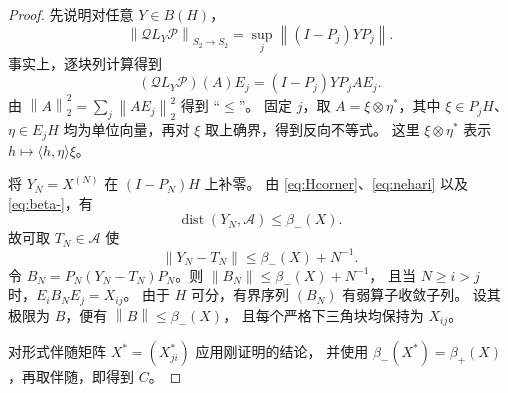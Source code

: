 \documentclass[UTF8,11pt,a4paper,fontset=fandol]{ctexart}
\theoremstyle{remark}
\newcommand{\BH}{B(H)}
\newcommand{\dist}{\operatorname{dist}}
\newcommand{\PP}{\mathcal P}
\newcommand{\QQ}{\mathcal Q}
\newcommand{\Alg}{\mathcal A}
\newcommand{\norm}[1]{\left\lVert #1\right\rVert}
\numberwithin{equation}{section}
\begin{document}
\begin{proof}
先说明对任意 $Y\in\BH$，
\begin{equation}\label{eq:Hcorner}
 \norm{\QQ L_Y\PP}_{S_2\to S_2}
 =\sup_j\norm{(I-P_j)YP_j}.
\end{equation}
事实上，逐块列计算得到
\[
 (\QQ L_Y\PP)(A)E_j=(I-P_j)YP_jAE_j.
\]
由 $\norm A_2^2=\sum_j\norm{AE_j}_2^2$ 得到 ``$\leq$''。
固定 $j$，取 $A=\xi\otimes\eta^*$，其中 $\xi\in P_jH$、
$\eta\in E_jH$ 均为单位向量，再对 $\xi$ 取上确界，得到反向不等式。
这里 $\xi\otimes\eta^*$ 表示 $h\mapsto\langle h,\eta\rangle\xi$。

将 $Y_N=X^{(N)}$ 在 $(I-P_N)H$ 上补零。
由 \eqref{eq:Hcorner}、\eqref{eq:nehari} 以及 \eqref{eq:beta-}，有
\[
 \dist(Y_N,\Alg)\leq\beta_-(X).
\]
故可取 $T_N\in\Alg$ 使
\[
 \norm{Y_N-T_N}\leq\beta_-(X)+N^{-1}.
\]
令 $B_N=P_N(Y_N-T_N)P_N$。则 $\norm{B_N}\leq\beta_-(X)+N^{-1}$，
且当 $N\geq i>j$ 时，$E_iB_NE_j=X_{ij}$。
由于 $H$ 可分，有界序列 $(B_N)$ 有弱算子收敛子列。
设其极限为 $B$，便有 $\norm B\leq\beta_-(X)$，
且每个严格下三角块均保持为 $X_{ij}$。

对形式伴随矩阵 $X^*=(X_{ji}^*)$ 应用刚证明的结论，
并使用 $\beta_-(X^*)=\beta_+(X)$，再取伴随，即得到 $C$。
\end{proof}
\end{document}
